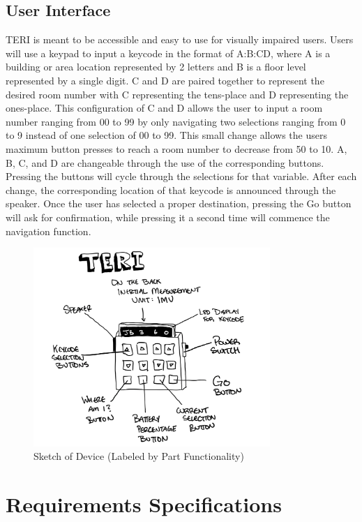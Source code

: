 \documentclass{article}
\begin{document}
\subsection{User Interface}
TERI is meant to be accessible and easy to use for visually impaired users. Users will use a keypad to input a keycode in the format of A:B:CD, where A is a building or area location represented by 2 letters and B is a floor level represented by a single digit. C and D are paired together to represent the desired room number with C representing the tens-place and D representing the ones-place. This configuration of C and D allows the user to input a room number ranging from 00 to 99 by only navigating two selections ranging from 0 to 9 instead of one selection of 00 to 99. This small change allows the users maximum button presses to reach a room number to decrease from 50 to 10. A, B, C, and D are changeable through the use of the corresponding buttons. Pressing the buttons will cycle through the selections for that variable. After each change, the corresponding location of that keycode is announced through the speaker. Once the user has selected a proper destination, pressing the Go button will ask for confirmation, while pressing it a second time will commence the navigation function.

\begin{figure}[ht!]
    \centering
    \includegraphics[width=0.8\textwidth]{user_interface_design.png}
    \caption{Sketch of Device (Labeled by Part Functionality)}
    \label{fig:teri_sketch}
\end{figure}

\section{Requirements Specifications}
\end{document}
